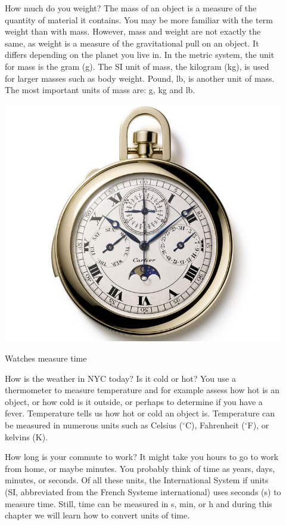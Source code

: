 \documentclass[main.tex]{subfiles}
\begin{document}
\begin{description}
\item[]How much do you weight? The mass of an object is a measure of the quantity of material it contains. You may be more familiar with the term weight than with mass. However, mass and weight are not exactly the same, as  weight is a measure of the gravitational pull on an object. It differs depending on the planet you live in. In the metric system, the unit for mass is the gram (g). The SI unit of mass, the kilogram (kg), is used for larger masses such as body weight. Pound, lb, is another unit of mass. The most important units of mass are: g, kg and lb.


  \begin{marginfigure}
      \includegraphics{chapter1/figure1-2}
      \caption{Watches measure time}
      \label{fig:marginfig}
   \end{marginfigure}

\item[] How is the weather in NYC today? Is it cold or hot? You use a thermometer to measure temperature and for example assess how hot is an object, or how cold is it outside, or perhaps to determine if you have a fever.  Temperature tells us how hot or cold an object is. Temperature can be measured in numerous units such as Celsius ($^{\circ}$C), Fahrenheit ($^{\circ}$F), or kelvins (K). 

\item[]How long is your commute to work? It might take you hours to go to work from home, or maybe minutes. You probably think of time as years, days, minutes, or seconds. Of all these units, the International System if units (SI, abbreviated from the French Systeme international) uses seconds (s) to measure time. Still, time can be measured in s, min, or h and during this chapter we will learn how to convert units of time.





\end{description}
\end{document}
